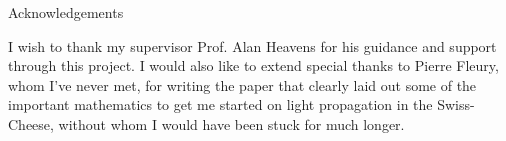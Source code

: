 \begin{center}
  \LARGE Acknowledgements
\end{center}
%
\noindent
%


I wish to thank my supervisor Prof. Alan Heavens for his guidance and support through this project. I would also like to extend special thanks to Pierre Fleury, whom I've never met, for writing the paper that clearly laid out some of the important mathematics to get me started on light propagation in the Swiss-Cheese, without whom I would have been stuck for much longer. 